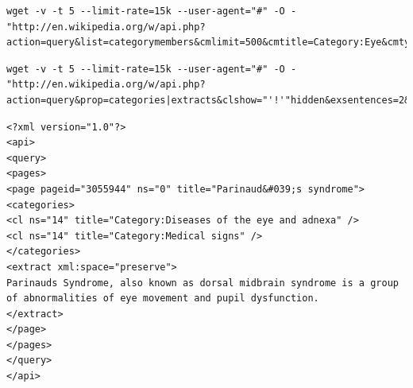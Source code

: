 \documentclass[pagesize,paper=A4,DIV=calc,fontsize=12pt,draft=false]{scrreprt}
\begin{document}
\lstset{
language=bash
}

\begin{lstlisting}[caption={Holen aller Unterkategorien der Kategorie \emph{Eye}. Erläuterung \emph{wget}: Ausgabe \emph{verbose}, maximal 5 Versuche, maximal mit 15 kB/s holen, Ausgabe nach \emph{stdout} umleiten. User-Agent-String zur besseren Übersicht hier nicht aufgeführt. Erläuterung API-String: hole die Liste der Unterkategorien und Artikelnamen, maximal 500 Einträge (das ist auch das zulässige Maximum, das das API erlaubt). Sonstiges: daraus werden eine Liste der Artikel und eine Liste der Kategorien produziert.},label=list:getcats]
wget -v -t 5 --limit-rate=15k --user-agent="#" -O - "http://en.wikipedia.org/w/api.php?action=query&list=categorymembers&cmlimit=500&cmtitle=Category:Eye&cmtype=page|subcat&cmprop=title|type&format=xml"
\end{lstlisting}

\begin{lstlisting}[caption={Aus der Liste der Artikel werden die ersten beiden Sätze geholt im nicht-annotierten Format und ohne die Verwaltungskategorien. User-Agent-String zur besseren Übersicht hier nicht aufgeführt. Erläuterung zu den Anführungszeichen: die Befehlshistorie der Bash verwendet das Ausrufungszeichen als Steuerzeichen, daher darf es im URL nicht interpretiert werden und muss in einzelne Anführungszeichen.},label=list:getarts]
wget -v -t 5 --limit-rate=15k --user-agent="#" -O - "http://en.wikipedia.org/w/api.php?action=query&prop=categories|extracts&clshow="'!'"hidden&exsentences=2&explaintext&exsectionformat=plain&titles=Parinaud's_syndrome&cllimit=500&format=xml"
\end{lstlisting}


\lstset{
language=XML
}

\begin{lstlisting}[caption={XML-Quelltext eines typischen Artikels der Wikipedia: \enquote{Parinaud's syndrome}},label=list:showxml]
<?xml version="1.0"?>
<api>
<query>
<pages>
<page pageid="3055944" ns="0" title="Parinaud&#039;s syndrome">
<categories>
<cl ns="14" title="Category:Diseases of the eye and adnexa" />
<cl ns="14" title="Category:Medical signs" />
</categories>
<extract xml:space="preserve">
Parinauds Syndrome, also known as dorsal midbrain syndrome is a group of abnormalities of eye movement and pupil dysfunction.
</extract>
</page>
</pages>
</query>
</api>
\end{lstlisting}

\lstset{
language=bash
}
\end{document}
